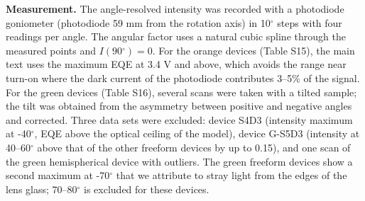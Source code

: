 \documentclass[10pt]{article}
\begin{document}
\textbf{Measurement.} The angle-resolved intensity was recorded with a photodiode goniometer (photodiode 59 mm from the rotation axis) in 10\ensuremath{^\circ} steps with four readings per angle. The angular factor uses a natural cubic spline through the measured points and $I(90\ensuremath{^\circ}) = 0$. For the orange devices (Table S15), the main text uses the maximum EQE at 3.4 V and above, which avoids the range near turn-on where the dark current of the photodiode contributes 3–5\% of the signal. For the green devices (Table S16), several scans were taken with a tilted sample; the tilt was obtained from the asymmetry between positive and negative angles and corrected. Three data sets were excluded: device S4D3 (intensity maximum at -40\ensuremath{^\circ}, EQE above the optical ceiling of the model), device G-S5D3 (intensity at 40–60\ensuremath{^\circ} above that of the other freeform devices by up to 0.15), and one scan of the green hemispherical device with outliers. The green freeform devices show a second maximum at -70\ensuremath{^\circ} that we attribute to stray light from the edges of the lens glass; 70–80\ensuremath{^\circ} is excluded for these devices.

\begin{table}[htbp]
\centering
\footnotesize
\caption*{\textbf{Table S15.} Orange devices. EQE$_{\max}$: maximum above turn-on (voltage, luminance). EQE$_{\geq 3.4\,\mathrm{V}}$: maximum at 3.4 V and above (main text). Angular factor at EQE$_{\max}$.}
\end{table}
\end{document}
